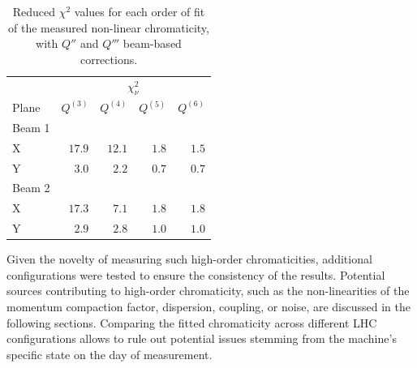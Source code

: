 \begin{table}[!htb]
    \centering
    \begin{tabular}{lrrrr}
     \toprule
                  & \multicolumn{4}{c}{$\chi^2_\nu$} \\
        Plane     &   $Q^{(3)}$ &  $Q^{(4)}$ &   $Q^{(5)}$ &   $Q^{(6)}$  \\
      \midrule
        Beam 1    &   &   &   & \\
        \hspace{2mm}X         & $17.9$  & $12.1$ & $1.8$ & $1.5$ \\         %
        \hspace{2mm}Y         & $ 3.0$  & $2.2 $ & $0.7$ & $0.7 $\\          %
        Beam 2    &    &    &   &\\
        \hspace{2mm}X         & $17.3$ & $7.1$ & $1.8$ & $1.8$ \\           %
        \hspace{2mm}Y         & $2.9 $ & $2.8$ & $1.0$ & $1.0$ \\            %
      \bottomrule
    \end{tabular}
    \caption{Reduced $\chi^2$ values for each order of fit of the measured non-linear chromaticity, with $Q''$ and $Q'''$ beam-based corrections.}
    \label{tab:high_orders:chisquare_quality}
  \end{table}



Given the novelty of measuring such high-order chromaticities, additional configurations were tested
to ensure the consistency of the results.
Potential sources contributing to high-order chromaticity,
such as the non-linearities of the momentum compaction factor, dispersion, coupling, or noise, are
discussed in the following sections.
Comparing the fitted chromaticity across different LHC
configurations allows to rule out potential issues stemming from the machine's specific state on the day of
measurement.



